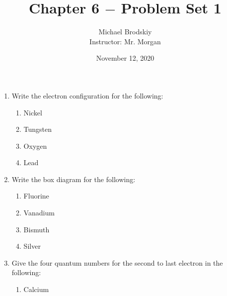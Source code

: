 \documentclass[12pt]{article}
\title{Chapter 6 $-$ Problem Set 1}
\date{November 12, 2020}
\author{Michael Brodskiy\\ \small Instructor: Mr. Morgan}
\begin{document}
\maketitle

\begin{enumerate}

  \item Write the electron configuration for the following:

    \begin{enumerate}

      \item Nickel

        \begin{center}
        \end{center}

      \item Tungsten

      \begin{center}
      \end{center}

      \item Oxygen

      \item Lead

    \end{enumerate}

  \item Write the box diagram for the following:

    \begin{enumerate}

      \item Fluorine

      \item Vanadium

      \item Bismuth

      \item Silver

    \end{enumerate}

  \item Give the four quantum numbers for the second to last electron in the following:

    \begin{enumerate}

      \item Calcium


\end{enumerate}
\end{enumerate}
\end{document}

